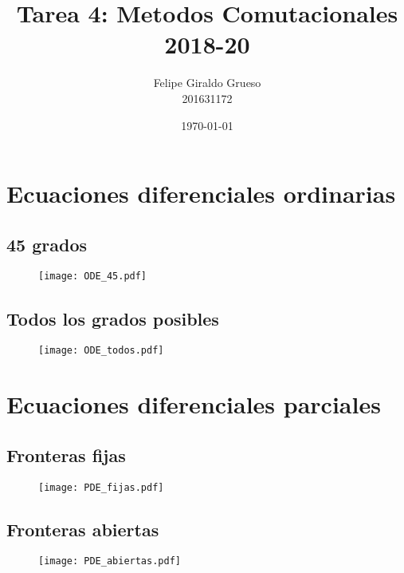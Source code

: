 \documentclass[11pt]{article}
\begin{document}
\title{Tarea 4: Metodos Comutacionales \\ 2018-20}%

\author{Felipe Giraldo Grueso \\ 201631172}

\date{\today}

\maketitle

\section{Ecuaciones diferenciales ordinarias}
	\subsection{45 grados}
		\begin{figure}[H]
    			\begin{center}
    				\texttt{[image: ODE\_45.pdf]}
    				\caption{}
			\end{center}
    			\label{fig:45}
		\end{figure}

	\subsection{Todos los grados posibles}
		\begin{figure}[H]
    			\centering
    				\texttt{[image: ODE\_todos.pdf]}
    				\caption{}
    			\label{fig:todos}
		\end{figure}


\section{Ecuaciones diferenciales parciales}
	\subsection{Fronteras fijas}
		\begin{figure}[H]
    			\centering
    				\texttt{[image: PDE\_fijas.pdf]}
    				\caption{}
    			\label{fig:fijas}
		\end{figure}

	\subsection{Fronteras abiertas}
		\begin{figure}[H]
    			\centering
    				\texttt{[image: PDE\_abiertas.pdf]}
    				\caption{}
    			\label{fig:abiertas}
		\end{figure}
\end{document}
